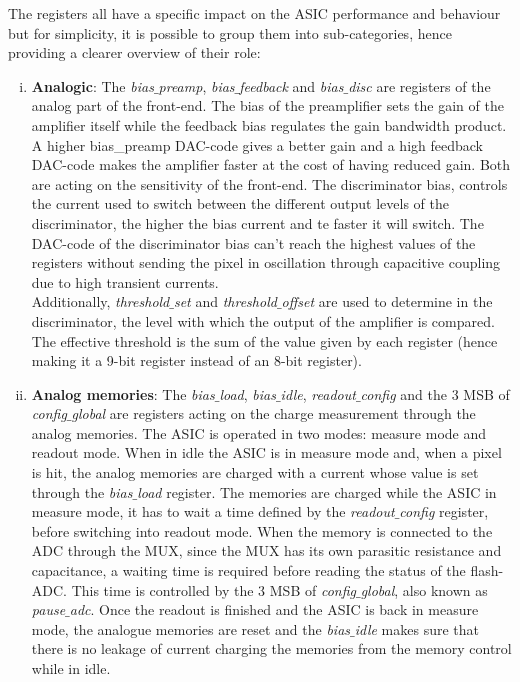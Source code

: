 		The registers all have a specific impact on the ASIC performance and behaviour but for simplicity, it is possible to group them into sub-categories, hence providing a clearer overview of their role:  
		\begin{enumerate}[i)]
			\item \textbf{Analogic}: The \textit{bias$\_$preamp}, \textit{bias$\_$feedback} and \textit{bias$\_$disc} are registers of the analog part of the front-end. The bias of the preamplifier sets the gain of the amplifier itself while the feedback bias regulates the gain bandwidth product. A higher bias\_preamp DAC-code gives a better gain and a high feedback DAC-code makes the amplifier faster at the cost of having reduced gain. Both are acting on the sensitivity of the front-end. The discriminator bias, controls the current used to switch between the different output levels of the discriminator, the higher the bias current and te faster it will switch. The DAC-code of the discriminator bias can't reach the highest values of the registers without sending the pixel in oscillation through capacitive coupling due to high transient currents. \\ Additionally, \textit{threshold$\_$set} and \textit{threshold$\_$offset} are used to determine in the discriminator, the level with which the output of the amplifier is compared. The effective threshold is the sum of the value given by each register (hence making it a 9-bit register instead of an 8-bit register). 
			\item \textbf{Analog memories}: The \textit{bias$\_$load}, \textit{bias$\_$idle}, \textit{readout$\_$config} and the 3 MSB of \textit{config$\_$global} are registers acting on the charge measurement through the analog memories. The ASIC is operated in two modes: measure mode and readout mode. When in idle the ASIC is in measure mode and, when a pixel is hit, the analog memories are charged with a current whose value is set through the \textit{bias$\_$load} register. The memories are charged while the ASIC in measure mode, it has to wait a time defined by the \textit{readout$\_$config} register, before switching into readout mode. When the memory is connected to the ADC through the MUX, since the MUX has its own parasitic resistance and capacitance, a waiting time is required before reading the status of the flash-ADC. This time is controlled by the 3 MSB of \textit{config$\_$global}, also known as \textit{pause$\_$adc}. Once the readout is finished and the ASIC is back in measure mode, the analogue memories are reset and the \textit{bias$\_$idle} makes sure that there is no leakage of current charging the memories from the memory control while in idle. 

\end{enumerate}

